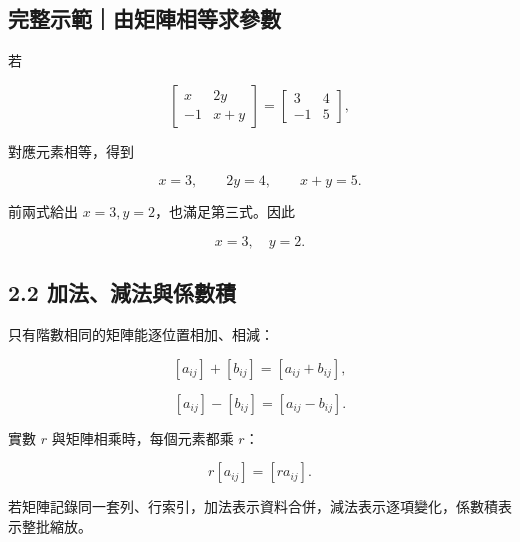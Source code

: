 \documentclass[11pt,a4paper]{article}
\begin{document}
\begin{HandoutWorkedExample}

\subsection{完整示範｜由矩陣相等求參數}\label{ux5b8cux6574ux793aux7bc4ux7531ux77e9ux9663ux76f8ux7b49ux6c42ux53c3ux6578}

若

\[
\begin{bmatrix}
x&2y\\
-1&x+y
\end{bmatrix}
=
\begin{bmatrix}
3&4\\
-1&5
\end{bmatrix},
\]

對應元素相等，得到

\[
x=3,\qquad 2y=4,\qquad x+y=5.
\]

前兩式給出 \(x=3,y=2\)，也滿足第三式。因此

\[
\boxed{x=3,\quad y=2}.
\]

\end{HandoutWorkedExample}

\subsection{2.2 加法、減法與係數積}\label{ux52a0ux6cd5ux6e1bux6cd5ux8207ux4fc2ux6578ux7a4d}

只有階數相同的矩陣能逐位置相加、相減：

\[
[a_{ij}]+[b_{ij}]=[a_{ij}+b_{ij}],
\]

\[
[a_{ij}]-[b_{ij}]=[a_{ij}-b_{ij}].
\]

實數 \(r\) 與矩陣相乘時，每個元素都乘 \(r\)：

\[
r[a_{ij}]=[ra_{ij}].
\]

若矩陣記錄同一套列、行索引，加法表示資料合併，減法表示逐項變化，係數積表示整批縮放。
\end{document}

